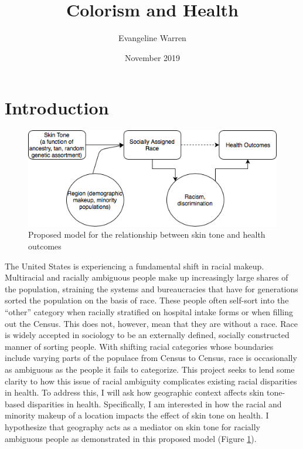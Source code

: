 \documentclass{article}
\title{Colorism and Health}
\author{Evangeline Warren}
\date{November 2019}
\begin{document}
\maketitle

\section{Introduction}
\begin{figure}[h!]
\centering
\includegraphics[scale=.5]{Colorism.png}
\caption{Proposed model for the relationship between skin tone and health outcomes}
\label{fig:colorism}
\end{figure}
The United States is experiencing a fundamental shift in racial makeup. Multiracial and racially ambiguous people make up increasingly large shares of the population, straining the systems and bureaucracies that have for generations sorted the population on the basis of race. \cite{Alba2018} These people often self-sort into the “other” category when racially stratified on hospital intake forms or when filling out the Census. \cite{Macintosh2013,Cobb2016,Jones2008} This does not, however, mean that they are without a race. Race is widely accepted in sociology to be an externally defined, socially constructed manner of sorting people.\cite{Cobb2016} With shifting racial categories whose boundaries include varying parts of the populace from Census to Census, race is occasionally as ambiguous as the people it fails to categorize. \cite{Alba2018, Morning2018}
This project seeks to lend some clarity to how this issue of racial ambiguity complicates existing racial disparities in health. To address this, I will ask how geographic context affects skin tone-based disparities in health. Specifically, I am interested in how the racial and minority makeup of a location impacts the effect of skin tone on health. I hypothesize that geography acts as a mediator on skin tone for racially ambiguous people as demonstrated in this proposed model (Figure \ref{fig:colorism}).  
\end{document}
